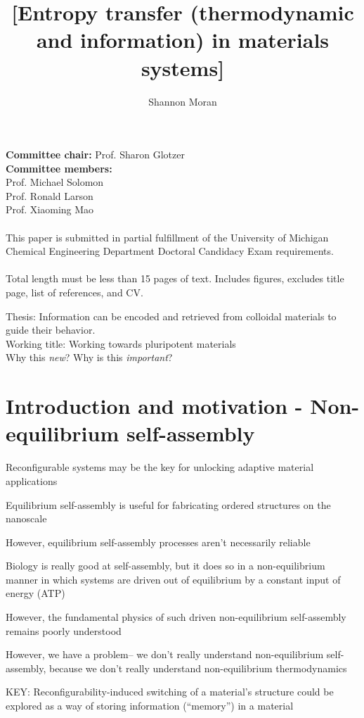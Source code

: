 \documentclass[11pt, oneside]{article}   	%
\title{[Entropy transfer (thermodynamic and information) in materials systems]}
\author{Shannon Moran}
\date{}
\begin{document}
\maketitle
\thispagestyle{empty}
\noindent
\textbf{Committee chair:} Prof. Sharon Glotzer \\ \textbf{Committee members:} \\ Prof. Michael Solomon \\ Prof. Ronald Larson \\ Prof. Xiaoming Mao
\\ \\
\noindent 
This paper is submitted in partial fulfillment of the University of Michigan Chemical Engineering Department Doctoral Candidacy Exam requirements.
\\ \\
Total length must be less than 15 pages of text. Includes figures, excludes title page, list of references, and CV.
\newpage


Thesis: Information can be encoded and retrieved from colloidal materials to guide their behavior. \\
Working title: Working towards pluripotent materials \\
Why this \textit{new}? Why is this \textit{important}?

\section{Introduction and motivation - Non-equilibrium self-assembly}

Reconfigurable systems may be the key for unlocking adaptive material applications

Equilibrium self-assembly is useful for fabricating ordered structures on the nanoscale

However, equilibrium self-assembly processes aren't necessarily reliable 

Biology is really good at self-assembly, but it does so in a non-equilibrium manner in which systems are driven out of equilibrium by a constant input of energy (ATP)

However, the fundamental physics of such driven non-equilibrium self-assembly remains poorly understood

However, we have a problem-- we don't really understand non-equilibrium self-assembly, because we don't really understand non-equilibrium thermodynamics

KEY: 
Reconfigurability-induced switching of a material's structure could be explored as a way of storing information (``memory'') in a material
\end{document}

